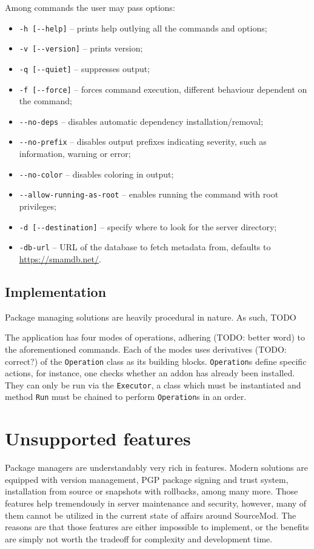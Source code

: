 Among commands the user may pass options:
\begin{itemize}
    \item \verb|-h [--help]| -- prints help outlying all the commands and options;
    \item \verb|-v [--version]| -- prints version;
    \item \verb|-q [--quiet]| -- suppresses output;
    \item \verb|-f [--force]| -- forces command execution, different behaviour dependent on the command;
    \item \verb|--no-deps| -- disables automatic dependency installation/removal;
    \item \verb|--no-prefix| -- disables output prefixes indicating severity, such as information, warning or error;
    \item \verb|--no-color| -- disables coloring in output;
    \item \verb|--allow-running-as-root| -- enables running the command with root privileges;
    \item \verb|-d [--destination]| -- specify where to look for the server directory;
    \item \verb|-db-url| -- URL of the database to fetch metadata from, defaults to \url{https://smamdb.net/}.
\end{itemize}

\subsection{Implementation}

Package managing solutions are heavily procedural in nature.
As such, TODO

The application has four modes of operations, adhering (TODO: better word) to the aforementioned commands.
Each of the modes uses derivatives (TODO: correct?) of the \verb|Operation| class as its building blocks.
\verb|Operation|s define specific actions, for instance, one checks whether an addon has already been installed.
They can only be run via the \verb|Executor|, a class which must be instantiated and method \verb|Run| must be chained to perform \verb|Operation|s in an order.

\section{Unsupported features}

Package managers are understandably very rich in features.
Modern solutions are equipped with version management, PGP package signing and trust system, installation from source or snapshots with rollbacks, among many more.
Those features help tremendously in server maintenance and security, however, many of them cannot be utilized in the current state of affairs around SourceMod.
The reasons are that those features are either impossible to implement, or the benefits are simply not worth the tradeoff for complexity and development time.

